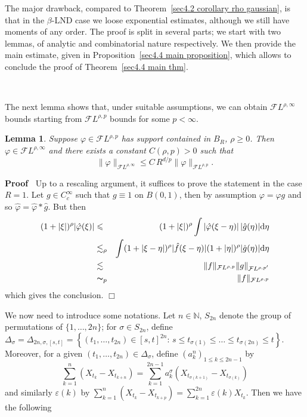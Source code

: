 \documentclass[10pt]{article}
\newcommand{\mathd}{\mathrm{d}}
\newenvironment{proof}{\noindent\textbf{Proof\ }}{\hspace*{\fill}$\Box$\medskip}
\newtheorem{lemma}[theorem]{Lemma}
\begin{document}
The major drawback, compared to Theorem~\ref{sec4.2 corollary rho gaussian},
is that in the $\beta$\mbox{-}LND case we loose exponential estimates,
although we still have moments of any order. The proof is split in several
parts; we start with two lemmas, of analytic and combinatorial nature
respectively. We then provide the main estimate, given in
Proposition~\ref{sec4.4 main proposition}, which allows to conclude the proof
of Theorem~\ref{sec4.4 main thm}.

\

The next lemma shows that, under suitable assumptions, we can obtain
$\mathcal{F} L^{\rho, \infty}$ bounds starting from $\mathcal{F} L^{\rho, p}$
bounds for some $p < \infty$.

\begin{lemma}
  \label{sec4.4 analytic lemma}Suppose $\varphi \in \mathcal{F} L^{\rho, p}$
  has support contained in $B_R$, $\rho \geqslant 0$. Then $\varphi \in
  \mathcal{F} L^{\rho, \infty}$ and there exists a constant $C (\rho, p) > 0$
  such that
  \begin{equation}
    \| \varphi \|_{\mathcal{F} L^{\rho, \infty}} \leqslant C \, R^{d / p} \|
    \varphi \|_{\mathcal{F} L^{\rho, p}} .
  \end{equation}
\end{lemma}

\begin{proof}
  Up to a rescaling argument, it suffices to prove the statement in the case
  $R = 1$. Let $g \in C^{\infty}_c$ such that $g \equiv 1$ on $B (0, 1)$, then
  by assumption $\varphi = \varphi g$ and so $\hat{\varphi} = \hat{\varphi}
  \ast \hat{g}$. But then
  \begin{eqnarray*}
    (1 + | \xi |)^{\rho} | \hat{\varphi} (\xi) | & \leqslant & (1 + | \xi
    |)^{\rho} \int | \hat{\varphi} (\xi - \eta) | \, | \hat{g} (\eta) | \mathd
    \eta\\
    & \lesssim_{\rho} & \int (1 + | \xi - \eta |)^{\rho} | \hat{f} (\xi -
    \eta) | (1 + | \eta |)^{\rho} | \hat{g} (\eta) | \mathd \eta\\
    & \lesssim & \| f \|_{\mathcal{F} L^{\rho, p}} \| g \|_{\mathcal{F}
    L^{\rho, p'}}\\
    & \thicksim_p & \| f \|_{\mathcal{F} L^{\rho, p}}
  \end{eqnarray*}
  which gives the conclusion.
\end{proof}

We now need to introduce some notations. Let $n \in \mathbb{N}$, $S_{2 n}$
denote the group of permutations of $\{ 1, \ldots, 2 n \}$; for $\sigma \in
S_{2 n}$, define $\Delta_{\sigma} = \Delta_{2 n, \sigma, [s, t]} = \left\{
(t_1, \ldots, t_{2 n}) \in [s, t]^{2 n} : \, s \leqslant t_{\sigma (1)}
\leqslant \ldots \leqslant t_{\sigma (2 n)} \leqslant t \right\}$. Moreover,
for a given $(t_1, \ldots, t_{2 n}) \in \Delta_{\sigma}$, define $(a_k^n)_{1
\leqslant k \leqslant 2 n - 1}$ by
\[ \sum_{k = 1}^n (X_{t_k} - X_{t_{k + n}}) = \sum_{k = 1}^{2 n - 1}
   a_k^{\sigma} (X_{t_{\sigma (k + 1)}} - X_{t_{\sigma (k)}}) \]
and similarly $\varepsilon (k)$ by $\sum_{k = 1}^n (X_{t_k} - X_{t_{k + p}}) =
\sum_{k = 1}^{2 n} \varepsilon (k) X_{t_k}$. Then we have the following
\end{document}
